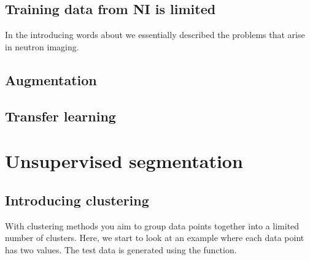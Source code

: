 \documentclass[letterpaper,10pt,english]{sphinxmanual}
\begin{document}
\section{Training data from NI is limited}
\label{\detokenize{ML4NeutronImageSegmentation:training-data-from-ni-is-limited}}
In the introducing words about  we essentially described the problems that arise in neutron imaging.


\section{Augmentation}
\label{\detokenize{ML4NeutronImageSegmentation:augmentation}}

\section{Transfer learning}
\label{\detokenize{ML4NeutronImageSegmentation:transfer-learning}}

\chapter{Unsupervised segmentation}
\label{\detokenize{ML4NeutronImageSegmentation:unsupervised-segmentation}}

\section{Introducing clustering}
\label{\detokenize{ML4NeutronImageSegmentation:introducing-clustering}}
With clustering methods you aim to group data points together into a limited number of clusters. Here, we start to look at an example where each data point has two values. The test data is generated using the  function.

\begin{sphinxVerbatim}[commandchars=\\\{\}]
   \PYG{p}{[}
                        \PYG{p}{]} \PYG{p}{[} \PYG{p}{]}
  
\end{sphinxVerbatim}
\end{document}
